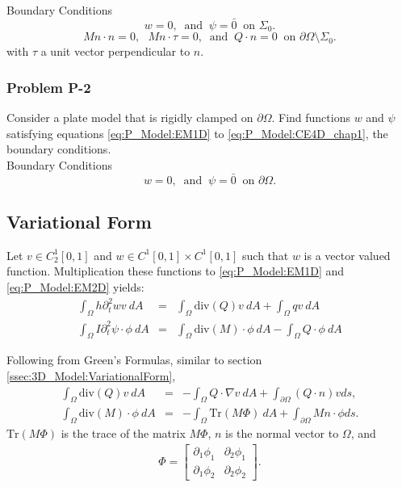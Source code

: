 \documentclass[../../main.tex]{subfiles}
\begin{document}
	Boundary Conditions\\
	\[w = 0,  \ \textrm{ and } \ \psi = \bar{0} \ \textrm{ on } \Sigma_0.\]
	\[Mn\cdot n = 0,\ \ \ Mn\cdot \tau = 0, \ \textrm{ and } \ Q \cdot n =0 \ \textrm{ on } \partial\Omega\setminus\Sigma_0.\]
	with $\tau$ a unit vector perpendicular to $n$.\\
	
	\subsubsection{Problem P-2}\label{sssec:P_Model:ProblemP2}
	Consider a plate model that is rigidly clamped on $\partial \Omega$. Find functions $w$ and $\psi$ satisfying equations \eqref{eq:P_Model:EM1D} to \eqref{eq:P_Model:CE4D_chap1}, the boundary conditions.\\
	
	Boundary Conditions\\
	\[w = 0,  \ \textrm{ and } \ \psi = \bar{0} \ \textrm{ on } \partial \Omega.\]
	
	
	\subsection{Variational Form}\label{ssec:P_Model:VariationalForm}
	Let $v \in C_2^1[0,1]$ and $w \in C^1[0,1] \times C^1[0,1]$ such that $w$ is a vector valued function. Multiplication these functions to \eqref{eq:P_Model:EM1D} and \eqref{eq:P_Model:EM2D} yields:
	\begin{eqnarray*}
		\int_\Omega h \partial_t^2 w v \ dA & = & \int_\Omega \textrm{div} (Q) v \ dA + \int_\Omega q v \ dA\\
		\int_\Omega I \partial_t^2 \psi \cdot \phi \ dA & = & \int_\Omega \textrm{div} (M) \cdot \phi \ dA - \int_\Omega Q \cdot \phi \ dA
	\end{eqnarray*}
	
	Following from Green's Formulas, similar to section \ref{ssec:3D_Model:VariationalForm}, 
	\begin{eqnarray*}
		\int_\Omega \textrm{div}(Q) v \ dA & = & - \int_\Omega Q \cdot \nabla v \ dA + \int_{\partial\Omega} (Q\cdot n)v ds,\\
		\int_\Omega \textrm{div}(M) \cdot \phi \ dA & = & - \int_\Omega \textrm{Tr} (M \Phi) \ dA + \int_{\partial\Omega} M n \cdot \phi ds.
	\end{eqnarray*}
	$\textrm{Tr} (M \Phi)$ is the trace of the matrix $M \Phi$, $n$ is the normal vector to $\Omega$, and 
	\begin{eqnarray*}
		\Phi = 
		\begin{bmatrix}
			\partial_1\phi_1 & \partial_2\phi_1\\
			\partial_1\phi_2 & \partial_2\phi_2
		\end{bmatrix}.
	\end{eqnarray*}
	
\end{document}
